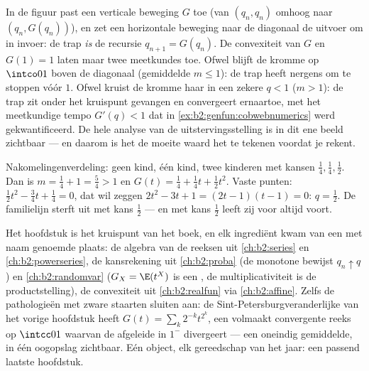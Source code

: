 \begin{remark}
In de figuur past een verticale beweging $G$ toe (van $(q_n, q_n)$
omhoog naar $(q_n, G(q_n))$), en zet een horizontale beweging naar
de diagonaal de uitvoer om in invoer: de trap \emph{is} de recursie
$q_{n+1} = G(q_n)$. De convexiteit van $G$ en $G(1) = 1$ laten maar
twee meetkundes toe. Ofwel blijft de kromme op $\intco01$ boven de
diagonaal (gemiddelde $m \leq 1$): de trap heeft nergens om te
stoppen vóór $1$. Ofwel kruist de kromme haar in een zekere $q < 1$
($m > 1$): de trap zit onder het kruispunt gevangen en convergeert
ernaartoe, met het meetkundige tempo $G'(q) < 1$ dat in
\cref{ex:b2:genfun:cobwebnumerics} werd gekwantificeerd. De hele
analyse van de uitstervingsstelling is in dit ene beeld zichtbaar
--- en daarom is het de moeite waard het te tekenen voordat je
rekent.
\end{remark}

\begin{example}\label{ex:b2:genfun:branchingexample}
Nakomelingenverdeling: geen kind, één kind, twee kinderen met
kansen $\frac14, \frac14, \frac12$. Dan is $m = \frac14 + 1 =
\frac54 > 1$ en $G(t) = \frac14 + \frac14 t + \frac12 t^2$. Vaste
punten: $\frac12 t^2 - \frac34 t + \frac14 = 0$, dat wil zeggen
$2t^2 - 3t + 1 = (2t - 1)(t - 1) = 0$: $q = \frac12$. De
familielijn sterft uit met kans $\frac12$ --- en met kans $\frac12$
leeft zij voor altijd voort.
\end{example}

\begin{remark}
Het hoofdstuk is het kruispunt van het boek, en elk ingrediënt
kwam van een met naam genoemde plaats: de algebra van de reeksen
uit \cref{ch:b2:series} en \cref{ch:b2:powerseries}, de
kansrekening uit \cref{ch:b2:proba} (de monotone 
bewijst $q_n \uparrow q$) en \cref{ch:b2:randomvar} ($G_X =
\E(t^X)$ is een , de multiplicativiteit is de
productstelling), de convexiteit uit \cref{ch:b2:realfun} via
\cref{ch:b2:affine}. Zelfs de pathologieën met zware staarten
sluiten aan: de Sint-Petersburgveranderlijke van het vorige
hoofdstuk heeft $G(t) = \sum_k2^{-k}t^{2^k}$, een volmaakt
convergente reeks op $\intcc01$ waarvan de afgeleide in $1^-$
divergeert --- een oneindig gemiddelde, in één oogopslag zichtbaar.
Eén object, elk gereedschap van het jaar: een passend laatste
hoofdstuk.
\end{remark}

